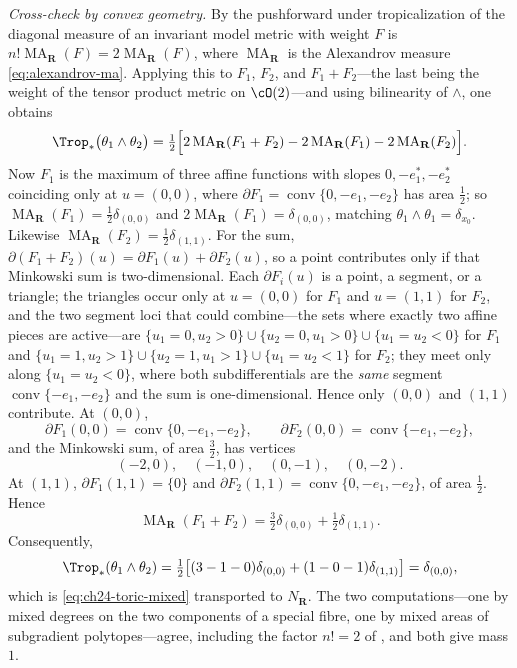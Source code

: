 \begin{example}
\emph{Cross-check by convex geometry.}  By
 the pushforward under tropicalization of the
diagonal measure of an invariant model metric with weight $F$ is
$n!\operatorname{MA}_{\mathbf R}(F)=2\operatorname{MA}_{\mathbf R}(F)$,
where $\operatorname{MA}_{\mathbf R}$ is the Alexandrov measure
\eqref{eq:alexandrov-ma}.  Applying this to $F_1$, $F_2$, and
$F_1+F_2$---the last being the weight of the tensor product metric on
$\cO(2)$---and using bilinearity of $\wedge$, one obtains
\[
 \Trop_*\bigl(\theta_1\wedge\theta_2\bigr)
 =\tfrac12\Bigl[
   2\operatorname{MA}_{\mathbf R}(F_1+F_2)
   -2\operatorname{MA}_{\mathbf R}(F_1)
   -2\operatorname{MA}_{\mathbf R}(F_2)\Bigr].
\]
Now $F_1$ is the maximum of three affine functions with slopes
$0,-e_1^*,-e_2^*$ coinciding only at $u=(0,0)$, where
$\partial F_1=\operatorname{conv}\{0,-e_1,-e_2\}$ has area $\tfrac12$;
so $\operatorname{MA}_{\mathbf R}(F_1)=\tfrac12\delta_{(0,0)}$ and
$2\operatorname{MA}_{\mathbf R}(F_1)=\delta_{(0,0)}$, matching
$\theta_1\wedge\theta_1=\delta_{x_0}$.  Likewise
$\operatorname{MA}_{\mathbf R}(F_2)=\tfrac12\delta_{(1,1)}$.  For the sum,
$\partial(F_1+F_2)(u)=\partial F_1(u)+\partial F_2(u)$, so a point
contributes only if that Minkowski sum is two-dimensional.  Each
$\partial F_i(u)$ is a point, a segment, or a triangle; the triangles occur
only at $u=(0,0)$ for $F_1$ and $u=(1,1)$ for $F_2$, and the two
segment loci that could combine---the sets where exactly two affine pieces
are active---are $\{u_1=0,u_2>0\}\cup\{u_2=0,u_1>0\}\cup\{u_1=u_2<0\}$
for $F_1$ and $\{u_1=1,u_2>1\}\cup\{u_2=1,u_1>1\}
\cup\{u_1=u_2<1\}$ for $F_2$; they meet only along
$\{u_1=u_2<0\}$, where both subdifferentials are the \emph{same}
segment $\operatorname{conv}\{-e_1,-e_2\}$ and the sum is one-dimensional.
Hence only $(0,0)$ and $(1,1)$ contribute.  At $(0,0)$,
\[
 \partial F_1(0,0)=\operatorname{conv}\{0,-e_1,-e_2\},
 \qquad
 \partial F_2(0,0)=\operatorname{conv}\{-e_1,-e_2\},
\]
and the Minkowski sum, of area $\tfrac32$, has vertices
\[
 (-2,0),\quad(-1,0),\quad(0,-1),\quad(0,-2).
\]
At $(1,1)$,
$\partial F_1(1,1)=\{0\}$ and
$\partial F_2(1,1)=\operatorname{conv}\{0,-e_1,-e_2\}$, of area
$\tfrac12$.  Hence
\[
 \operatorname{MA}_{\mathbf R}(F_1+F_2)
 =\tfrac32\delta_{(0,0)}+\tfrac12\delta_{(1,1)}.
\]
Consequently,
\[
 \Trop_*(\theta_1\wedge\theta_2)
 =\tfrac12\bigl[(3-1-0)\delta_{(0,0)}+(1-0-1)\delta_{(1,1)}\bigr]
 =\delta_{(0,0)},
\]
which is \eqref{eq:ch24-toric-mixed} transported to $N_{\mathbf R}$.  The
two computations---one by mixed degrees on the two components of a special
fibre, one by mixed areas of subgradient polytopes---agree, including the
factor $n!=2$ of , and both give mass
$1$.


\end{example}
